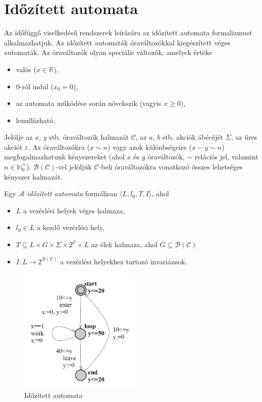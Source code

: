 \section{Időzített automata} \label{idozitett-automata}

Az időfüggő viselkedésű rendszerek leírására az időzített automata \cite{TimedAutomata} formalizmust alkalmazhatjuk. Az időzített automaták óraváltozókkal kiegészített véges automaták. Az óraváltozók olyan speciális változók, amelyek értéke

\begin{itemize}
    \item valós ($x\in\mathbb{R}$),
    \item 0-ról indul ($x_0=0$),
    \item az automata működése során növekszik (vagyis $x\geq0$),
    \item lenullázható.
\end{itemize}

Jelölje az $x$, $y$ stb. óraváltozók halmazát $\mathcal{C}$, az $a$, $b$ stb. akciók ábécéjét $\Sigma$, az üres akciót $\varepsilon$. Az óraváltozókra ($x \sim n$) vagy azok különbségeire ($x - y \sim n$) megfogalmazhatunk kényszereket (ahol $x$ és $y$ óraváltozók, $\sim$ relációs jel, valamint $n \in \mathbb{N}_0^+$). $\mathcal{B}(\mathcal{C})$-vel jelöljük $\mathcal{C}$-beli óraváltozókra vonatkozó összes lehetséges kényszer halmazát.

\begin{definition}
\label{IdőzítettAutomata}
Egy $\mathcal{A}$ \emph{időzített automata} formálisan $\langle L,l_0,T,I\rangle$, ahol
\begin{itemize}
    \item $L$ a vezérlési helyek véges halmaza,
    \item $l_0 \in L$ a kezdő vezérlési hely,
    \item $T \subseteq L \times G \times \Sigma \times 2^\mathcal{C} \times L$ az élek halmaza, ahol $G \subseteq \mathcal{B}(\mathcal{C})$
    \item $I: L \rightarrow 2^{\mathcal{B}(\mathcal{C})}$ a vezérlési helyekhez tartozó invariánsok.
\end{itemize}
\end{definition}

\begin{figure}
    \centering
    \includegraphics[height=60mm, keepaspectratio]{figures/idozitett-automata-pelda.png}
    \caption{Időzített automata \cite{TimedAutomata}}
    \label{fig:idozitett-automata-pelda}
\end{figure}

